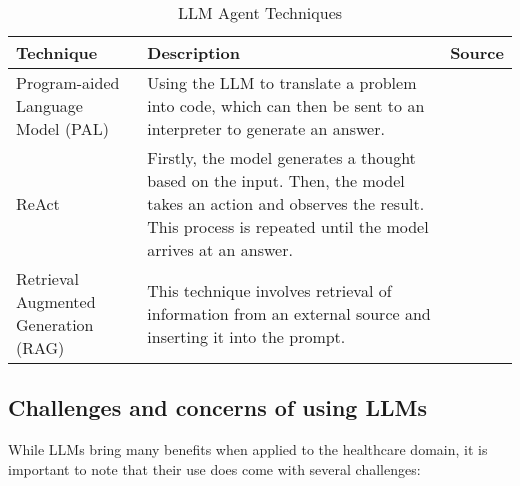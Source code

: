 \begin{table}[h!]
    \centering
    \begin{tabular}{p{3cm} p{8cm} p{2cm}}
        \toprule
        \textbf{Technique} & \textbf{Description} & \textbf{Source} \\
        \midrule
        \raggedright
        Program-aided Language Model (PAL) & Using the LLM to translate a problem into code, which can then be sent to an interpreter to generate an answer. & \textcite{pal} \\
        \hline
        \raggedright
        ReAct & Firstly, the model generates a thought based on the input. Then, the model takes an action and observes the result. This process is repeated until the model arrives at an answer. & \textcite{react-llm} \\
        \hline
        \raggedright
        Retrieval Augmented Generation (RAG) & This technique involves retrieval of information from an external source and inserting it into the prompt. & \textcite{rag} \\
        \bottomrule
    \end{tabular}
    \caption{LLM Agent Techniques}\label{tab:agents}
\end{table}

\FloatBarrier{}

\subsection{Challenges and concerns of using LLMs}

While LLMs bring many benefits when applied to the healthcare domain, it is important to note that their use does come with several challenges:


